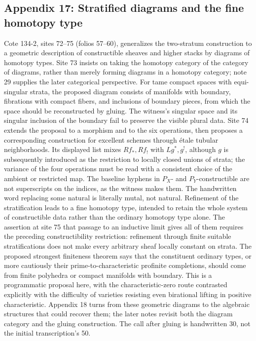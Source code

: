 \subsection*{Appendix 17: Stratified diagrams and the fine homotopy type}
Cote 134-2, sites 72--75 (folios 57--60), generalizes the two-stratum construction to a geometric description of constructible sheaves and higher stacks by diagrams of homotopy types. Site 73 insists on taking the homotopy category of the category of diagrams, rather than merely forming diagrams in a homotopy category; note 29 supplies the later categorical perspective. For tame compact spaces with equi-singular strata, the proposed diagram consists of manifolds with boundary, fibrations with compact fibers, and inclusions of boundary pieces, from which the space should be reconstructed by gluing. The witness's singular space and its singular inclusion of the boundary fail to preserve the visible plural data. Site 74 extends the proposal to a morphism and to the six operations, then proposes a corresponding construction for excellent schemes through étale tubular neighborhoods. Its displayed list mixes $Rf_*,Rf_!$ with $Lg^*,g^!$, although $g$ is subsequently introduced as the restriction to locally closed unions of strata; the variance of the four operations must be read with a consistent choice of the ambient or restricted map. The baseline hyphens in $P_X$- and $P_Y$-constructible are not superscripts on the indices, as the witness makes them. The handwritten word replacing some natural is literally mutal, not natural. Refinement of the stratification leads to a fine homotopy type, intended to retain the whole system of constructible data rather than the ordinary homotopy type alone. The assertion at site 75 that passage to an inductive limit gives all of them requires the preceding constructibility restriction: refinement through finite suitable stratifications does not make every arbitrary sheaf locally constant on strata. The proposed strongest finiteness theorem says that the constituent ordinary types, or more cautiously their prime-to-characteristic profinite completions, should come from finite polyhedra or compact manifolds with boundary. This is a programmatic proposal here, with the characteristic-zero route contrasted explicitly with the difficulty of varieties resisting even birational lifting in positive characteristic. Appendix 18 turns from these geometric diagrams to the algebraic structures that could recover them; the later notes revisit both the diagram category and the gluing construction. The call after gluing is handwritten 30, not the initial transcription's 50.

